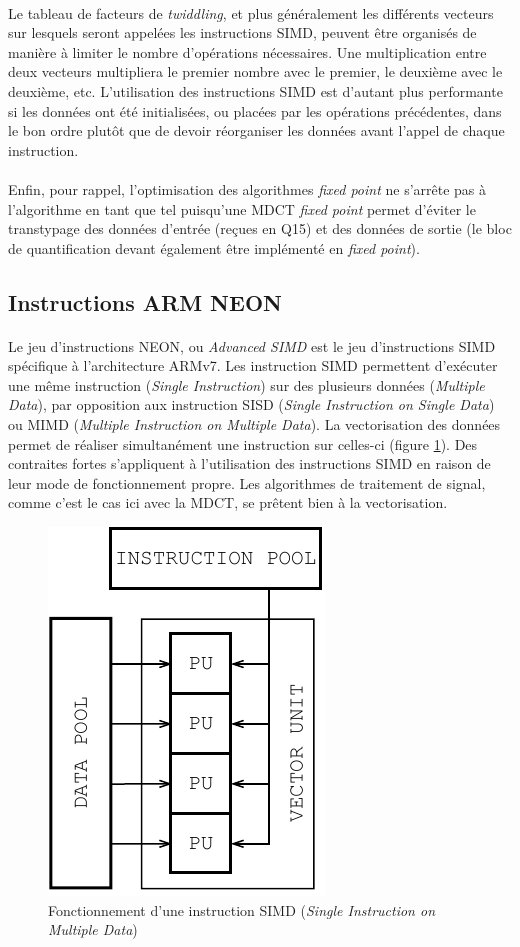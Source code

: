 \documentclass{article}
\begin{document}
    \paragraph{}
    Le tableau de facteurs de \emph{twiddling}, et plus généralement les différents vecteurs sur lesquels seront appelées les instructions SIMD, peuvent être organisés de manière à limiter le nombre d'opérations nécessaires. Une multiplication entre deux vecteurs multipliera le premier nombre avec le premier, le deuxième avec le deuxième, etc. L'utilisation des instructions SIMD est d'autant plus performante si les données ont été initialisées, ou placées par les opérations précédentes, dans le bon ordre plutôt que de devoir réorganiser les données avant l'appel de chaque instruction.

    \paragraph{}
    Enfin, pour rappel, l'optimisation des algorithmes \emph{fixed point} ne s'arrête pas à l'algorithme en tant que tel puisqu'une MDCT \emph{fixed point} permet d'éviter le transtypage des données d'entrée (reçues en Q15) et des données de sortie (le bloc de quantification devant également être implémenté en \emph{fixed point}).


    \subsection{Instructions ARM NEON}
    \paragraph{}
    Le jeu d'instructions NEON, ou \emph{Advanced SIMD} est le jeu d'instructions SIMD spécifique à l'architecture ARMv7. Les instruction SIMD permettent d'exécuter une même instruction (\emph{Single Instruction}) sur des plusieurs données (\emph{Multiple Data}), par opposition aux instruction SISD (\emph{Single Instruction on Single Data}) ou MIMD (\emph{Multiple Instruction on Multiple Data}). La vectorisation des données permet de réaliser simultanément une instruction sur celles-ci (figure \ref{fig:simd})\cite{wiki:SIMD}. Des contraites fortes s'appliquent à l'utilisation des instructions SIMD en raison de leur mode de fonctionnement propre. Les algorithmes de traitement de signal, comme c'est le cas ici avec la MDCT, se prêtent bien à la vectorisation.

    \begin{figure}[H]
        \centering
        \includegraphics[width=.22\linewidth]{./images/SIMD.pdf}
        \caption{Fonctionnement d'une instruction SIMD (\emph{Single Instruction on Multiple Data})}
        \label{fig:simd}
    \end{figure}
    
\end{document}
